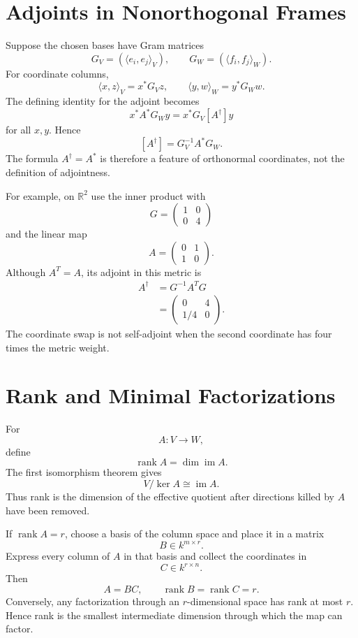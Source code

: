 \section{Adjoints in Nonorthogonal Frames}

Suppose the chosen bases have Gram matrices
\[
  G_V=(\langle e_i,e_j\rangle_V),
  \qquad
  G_W=(\langle f_i,f_j\rangle_W).
\]
For coordinate columns,
\[
  \langle x,z\rangle_V=x^*G_Vz,
  \qquad
  \langle y,w\rangle_W=y^*G_Ww.
\]
The defining identity for the adjoint becomes
\[
  x^*A^*G_Wy
  =x^*G_V[A^\dagger]y
\]
for all \(x,y\).  Hence
\[
  \boxed{
  [A^\dagger]
  =G_V^{-1}A^*G_W.}
\]
The formula \(A^\dagger=A^*\) is therefore a feature of orthonormal coordinates, not the definition of adjointness.

For example, on \(\mathbb R^2\) use the inner product with
\[
  G=
  \begin{pmatrix}
    1&0\\
    0&4
  \end{pmatrix}
\]
and the linear map
\[
  A=
  \begin{pmatrix}
    0&1\\
    1&0
  \end{pmatrix}.
\]
Although \(A^T=A\), its adjoint in this metric is
\[
\begin{aligned}
  A^\dagger
  &=G^{-1}A^TG\\
  &=
  \begin{pmatrix}
    0&4\\
    1/4&0
  \end{pmatrix}.
\end{aligned}
\]
The coordinate swap is not self-adjoint when the second coordinate has four times the metric weight.

\section{Rank and Minimal Factorizations}

For
\[
  A:V\to W,
\]
define
\[
  \operatorname{rank}A=\dim\operatorname{im}A.
\]
The first isomorphism theorem gives
\[
  V/\ker A\cong\operatorname{im}A.
\]
Thus rank is the dimension of the effective quotient after directions killed by \(A\) have been removed.

If \(\operatorname{rank}A=r\), choose a basis of the column space and place it in a matrix
\[
  B\in k^{m\times r}.
\]
Express every column of \(A\) in that basis and collect the coordinates in
\[
  C\in k^{r\times n}.
\]
Then
\[
  A=BC,
  \qquad
  \operatorname{rank}B
  =\operatorname{rank}C=r.
\]
Conversely, any factorization through an \(r\)-dimensional space has rank at most \(r\).  Hence rank is the smallest intermediate dimension through which the map can factor.

